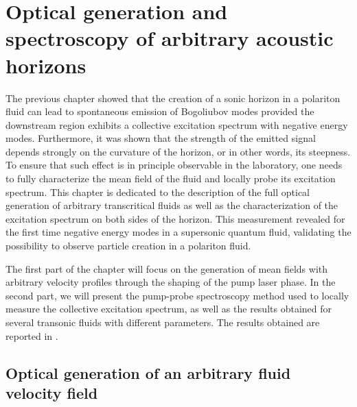 

\renewcommand{\floatpagefraction}{0.7}   %
\renewcommand{\textfraction}{0.1}
\renewcommand{\topfraction}{0.9}
\setcounter{topnumber}{2}
\setcounter{totalnumber}{2}

\graphicspath{{./}{./fig/}{./chap_custom_st/fig/}}

\chapter{Optical generation and spectroscopy of arbitrary acoustic horizons}

\label{chap:generation_transonic_fluid}


The previous chapter showed that the creation of a sonic horizon in a polariton fluid can lead to spontaneous emission of Bogoliubov modes provided the downstream region exhibits a collective excitation spectrum with
negative energy modes. Furthermore, it was shown that the strength of the emitted signal depends strongly on the curvature of the horizon, or in other words, its steepness. To ensure that such effect is in principle observable in the laboratory, one needs to fully characterize the mean field of the fluid and locally probe its excitation spectrum. This chapter is dedicated to the description of the full optical generation of arbitrary transcritical fluids as well as the characterization of the excitation spectrum on both sides of the horizon. 
This measurement revealed for the first time negative energy modes in a supersonic quantum fluid, validating the possibility to observe particle creation in a polariton fluid.

The first part of the chapter will focus on the generation of mean fields with arbitrary velocity profiles through the shaping of the pump laser phase. In the second part, we will present the pump-probe spectroscopy method used to locally measure the collective excitation spectrum, as well
as the results obtained for several transonic fluids with different parameters. The results obtained are reported in \cite{falque2024polaritonfluidsquantumfield}.

\section{Optical generation of an arbitrary fluid velocity field}


